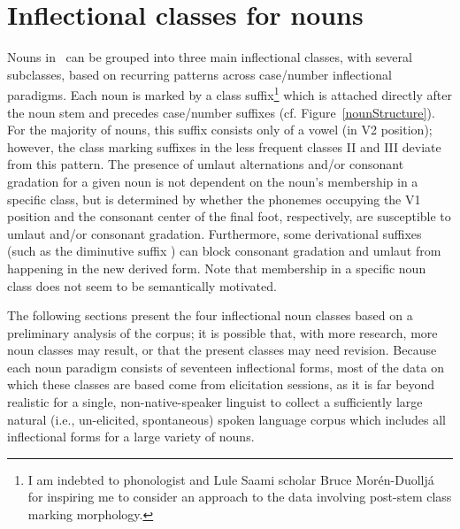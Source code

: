 

\section{Inflectional classes for nouns}\label{nounClasses}
Nouns in \PS\ can be grouped into three main inflectional classes, with several subclasses, based on recurring patterns across case/number inflectional paradigms. Each noun is marked by a class suffix\footnote{I am indebted to phonologist and Lule Saami scholar Bruce Morén-Duolljá for inspiring me to consider an approach to the data involving post-stem class marking morphology.} 
which is attached directly after the noun stem and precedes case/number suffixes (cf. Figure~\vref{nounStructure}). For the majority of nouns, this suffix consists only of a vowel (in V2 position); however, the class marking suffixes in the less frequent classes II and III deviate from this pattern. 
The presence of umlaut alternations and/or consonant gradation for a given noun is not dependent on the noun’s membership in a specific class, but is determined by whether the phonemes occupying the V1 position and the consonant center of the final foot, respectively, are susceptible to umlaut and/or consonant gradation. Furthermore, some derivational suffixes (such as the diminutive suffix ) can block consonant gradation and umlaut from happening in the new derived form. 
Note that membership in a specific noun class does not seem to be semantically motivated. 

The following sections present the four inflectional noun classes based on a preliminary analysis of the corpus; it is possible that, with more research, more noun classes may result, or that the present classes may need revision. Because each noun paradigm consists of seventeen inflectional forms, most of the data on which these classes are based come from elicitation sessions, as it is far beyond realistic for a single, non-native-speaker linguist to collect a sufficiently large natural (i.e., un-elicited, spontaneous) spoken language corpus which includes all inflectional forms for a large variety of nouns.

